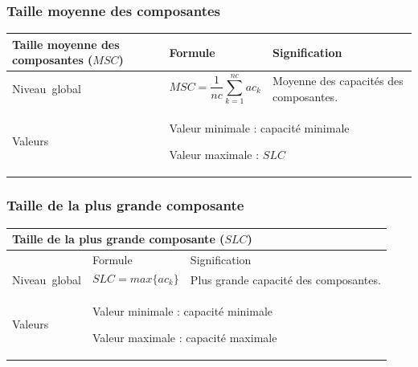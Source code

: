 \documentclass{article}
\begin{document}
\subsubsection{Taille moyenne des composantes}
\label{metric_MSC}
\begin{table}[H]
\begin{tabular}{|m{3.24cm}|m{4.4810004cm}m{7.924cm}|}

\hline
Taille moyenne des composantes ($MSC$) &
\multicolumn{1}{m{4.4810004cm}|}{Formule} &
Signification\\\hline
Niveau~global &
\multicolumn{1}{m{4.4810004cm}|}{\begin{equation*}
\mathit{MSC}=\frac{1}{\mathit{nc}}\sum _{k=1}^{\mathit{nc}}{{\mathit{ac}}_{k}}
\end{equation*}
} &
Moyenne des capacités des composantes.

\\\hline
Valeurs &
\multicolumn{2}{m{12.6050005cm}|}{Valeur minimale : capacité minimale

Valeur maximale :  $\mathit{SLC}$

}\\\hline
\end{tabular}
\end{table}


\subsubsection{Taille de la plus grande composante}
\label{metric_SLC}
\begin{table}[H]
\begin{tabular}{|m{3.24cm}|m{4.4810004cm}m{7.924cm}|}

\hline
\multicolumn{3}{|m{16.044998cm}|}{Taille de la plus grande composante ($SLC$)}\\\hline
 &
\multicolumn{1}{m{4.4810004cm}|}{Formule} &
Signification\\\hline
Niveau~global &
\multicolumn{1}{m{4.4810004cm}|}{\begin{equation*}
\mathit{SLC}=\mathit{max}\{{\mathit{ac}}_{k}\}
\end{equation*}
} &
Plus grande capacité des composantes.

\\\hline
Valeurs &
\multicolumn{2}{m{12.6050005cm}|}{Valeur minimale : capacité minimale

Valeur maximale : capacité maximale

}\\\hline
\end{tabular}
\end{table}
\end{document}
